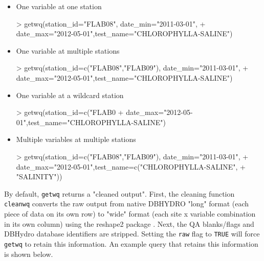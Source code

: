 \documentclass[12pt,notitlepage]{article}
\begin{document}
\begin{itemize}
\item One variable at one station

\begin{Schunk}
\begin{Sinput}
> getwq(station_id="FLAB08", date_min="2011-03-01",
+            date_max="2012-05-01",test_name="CHLOROPHYLLA-SALINE")
\end{Sinput}
\end{Schunk}

\item One variable at multiple stations

\begin{Schunk}
\begin{Sinput}
> getwq(station_id=c("FLAB08","FLAB09"), date_min="2011-03-01",
+            date_max="2012-05-01",test_name="CHLOROPHYLLA-SALINE")
\end{Sinput}
\end{Schunk}

\item One variable at a wildcard station

\begin{Schunk}
\begin{Sinput}
> getwq(station_id=c("FLAB0%
+            date_max="2012-05-01",test_name="CHLOROPHYLLA-SALINE")
\end{Sinput}
\end{Schunk}

\item Multiple variables at multiple stations

\begin{Schunk}
\begin{Sinput}
> getwq(station_id=c("FLAB08","FLAB09"), date_min="2011-03-01",
+            date_max="2012-05-01",test_name=c("CHLOROPHYLLA-SALINE",
+                                              "SALINITY"))
\end{Sinput}
\end{Schunk}

\end{itemize}

\noindent By default, \verb|getwq| returns a "cleaned output". First, the cleaning function \verb|cleanwq| converts the raw output from native DBHYDRO "long" format (each piece of data on its own row) to "wide" format (each site x variable combination in its own column) using the reshape2 package \citep{reshape2}. Next, the QA blanks/flags and DBHydro database identifiers are stripped. Setting the \texttt{raw} flag to \texttt{TRUE} will force \verb|getwq| to retain this information. An example query that retains this information is shown below.
\end{document}
